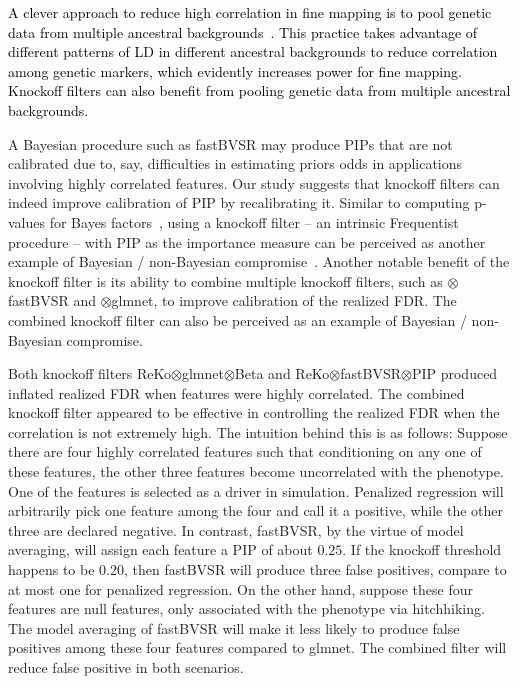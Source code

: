 \documentclass[12pt,Times]{article}
\def\cite{\citep}
\def\tcb{\textcolor{black}}
\begin{document}
\tcb{A clever approach to reduce high correlation in fine mapping is to pool genetic data from multiple ancestral backgrounds~\cite{ghost1,ghost2}. This practice takes advantage of different patterns of LD in different ancestral backgrounds to reduce correlation among genetic markers, which evidently increases power for fine mapping. Knockoff filters can also benefit from pooling genetic data from multiple ancestral backgrounds.}   

A Bayesian procedure such as fastBVSR may produce PIPs that are not calibrated due to, say,  difficulties in estimating priors odds in applications involving highly correlated features. Our study suggests that knockoff filters can indeed improve calibration of PIP by recalibrating it. Similar to computing p-values for Bayes factors~\cite{bf.null}, using a knockoff filter -- an intrinsic Frequentist procedure -- with PIP as the importance measure can be perceived as another example of Bayesian / non-Bayesian compromise~\cite{good}.   Another notable benefit of the knockoff filter is its ability to combine multiple knockoff filters, such as $\otimes$fastBVSR and $\otimes$glmnet,  to improve calibration of the realized FDR. The combined knockoff filter can also be perceived as an example of Bayesian / non-Bayesian compromise.  

Both knockoff filters ReKo\allowbreak$\otimes$glmnet\allowbreak$\otimes$Beta and ReKo\allowbreak$\otimes$fastBVSR\allowbreak$\otimes$PIP produced inflated realized FDR when features were highly correlated. The combined knockoff filter appeared to be effective in controlling the realized FDR when the correlation is not extremely high. 
The intuition behind this is as follows:  Suppose there are four highly correlated features such that conditioning on any one of these features, the other three features become uncorrelated with the phenotype. One of the features is selected as a driver in simulation. Penalized regression will arbitrarily pick one feature among the four and call it a positive, while the other three are declared negative. In contrast, fastBVSR, by the virtue of model averaging, will assign each feature a PIP of about $0.25$.  If the knockoff threshold happens to be $0.20$, then fastBVSR will produce three false positives, compare to at most one for penalized regression. On the other hand, suppose these four features are null features, only associated with the phenotype via hitchhiking. The model averaging of fastBVSR will make it less likely to produce false positives among these four features compared to glmnet. The combined filter will reduce false positive in both scenarios.  
\end{document}
